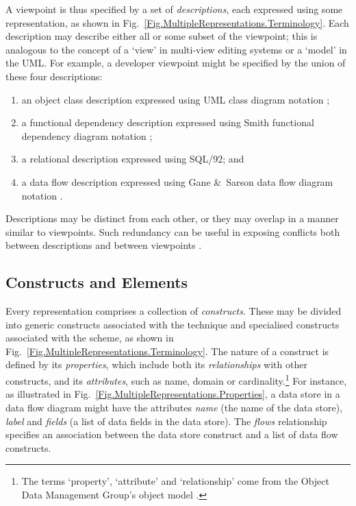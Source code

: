 \documentclass[10pt]{llncs}
\newcounter{tnote}
\begin{document}
A viewpoint is thus specified by a set of \emph{descriptions}, each expressed using some representation, as shown in Fig.~\ref{Fig.MultipleRepresentations.Terminology}. Each description may describe either all or some subset of the viewpoint; this is analogous to the concept of a `view' in multi-view editing systems \cite{Grun:JC:1993:PhD,Jaco:DA:1995:MultiView,Meye:S:1991:IEEE} or a `model' in the UML. For example, a developer viewpoint might be specified by the union of these four descriptions:

\begin{enumerate}
	\item an object class description expressed using UML class diagram notation \cite{OMG:1999:UML};
	\item a functional dependency description expressed using Smith functional dependency diagram notation \cite{Smit:HC:1985,Stan:N:1999:Smith};
	\item a relational description expressed using SQL/92; and
	\item a data flow description expressed using Gane \&~Sarson data flow diagram notation \cite{Gane:C:1979}.
\end{enumerate}

Descriptions may be distinct from each other, or they may overlap in a manner similar to viewpoints. Such redundancy can be useful in exposing conflicts both between descriptions and between viewpoints \cite{East:SM:1991:PhD}.


\subsection{Constructs and Elements}
\label{Sec:MultipleRepresentations:Representations:Constructs}

Every representation comprises a collection of \emph{constructs}. These may be divided into generic constructs associated with the technique and specialised constructs associated with the scheme, as shown in Fig.~\ref{Fig.MultipleRepresentations.Terminology}. The nature of a construct is defined by its \emph{properties}, which include both its \emph{relationships} with other constructs, and its \emph{attributes}, such as name, domain or cardinality.\footnote{The terms `property', `attribute' and `relationship' come from the Object Data Management Group's object model \cite{Catt:RGG:2000:ODMG3}.} For instance, as illustrated in Fig.~\ref{Fig.MultipleRepresentations.Properties}, a data store in a data flow diagram might have the attributes \emph{name} (the name of the data store), \emph{label} and \emph{fields} (a list of data fields in the data store). The \emph{flows} relationship specifies an association between the data store construct and a list of data flow constructs.
\end{document}
